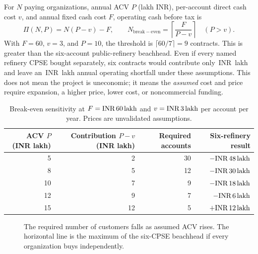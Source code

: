 \documentclass[11pt,a4paper]{article}
\newcommand{\inr}{\ifmmode\text{INR}\,\else INR\,\fi}
\newcommand{\lac}{\ifmmode\,\text{lakh}\else\,lakh\fi}
\begin{document}
For \(N\) paying organizations, annual ACV \(P\) (lakh INR), per-account direct cash cost \(v\), and annual fixed cash cost \(F\), operating cash before tax is
\begin{equation}
\Pi(N,P)=N(P-v)-F,\qquad
N_{\mathrm{break-even}}=\left\lceil\frac{F}{P-v}\right\rceil
\quad(P>v).
\label{eq:breakeven}
\end{equation}
With \(F=60\), \(v=3\), and \(P=10\), the threshold is \(\lceil60/7\rceil=9\) contracts. This is greater than the six-account public-refinery beachhead. Even if every named refinery CPSE bought separately, six contracts would contribute only \inr42\lac{} and leave an \inr18\lac{} annual operating shortfall under these assumptions. This does not mean the project is uneconomic; it means the \emph{assumed} cost and price require expansion, a higher price, lower cost, or noncommercial funding.

\begin{table}[htbp]
\centering
\caption{Break-even sensitivity at \(F=\inr60\lac{}\) and \(v=\inr3\lac{}\) per account per year. Prices are unvalidated assumptions.}
\label{tab:break}
\small
\begin{tabular}{@{}rrrr@{}}
\toprule
ACV \(P\) (INR lakh) & Contribution \(P-v\) (INR lakh) & Required accounts & Six-refinery result\\
\midrule
5 & 2 & 30 & \(-\inr48\lac\)\\
8 & 5 & 12 & \(-\inr30\lac\)\\
10 & 7 & 9 & \(-\inr18\lac\)\\
12 & 9 & 7 & \(-\inr6\lac\)\\
15 & 12 & 5 & \(+\inr12\lac\)\\
\bottomrule
\end{tabular}
\end{table}

\begin{figure}[htbp]
\centering
{}
\caption{The required number of customers falls as assumed ACV rises. The horizontal line is the maximum of the six-CPSE beachhead if every organization buys independently.}
\label{fig:breakeven}
\end{figure}
\end{document}
